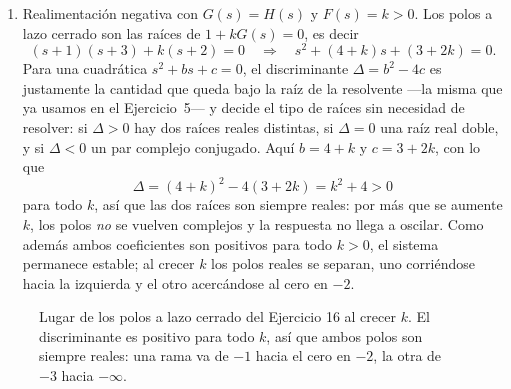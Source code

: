 \documentclass[10pt,a4paper]{article}
\begin{document}
\begin{enumerate}
	\item Realimentación negativa con $G(s)=H(s)$ y $F(s)=k>0$. Los polos a
	lazo cerrado son las raíces de $1+kG(s)=0$, es decir
	\[
		(s+1)(s+3)+k(s+2)=0
		\quad\Longrightarrow\quad
		s^2+(4+k)s+(3+2k)=0.
	\]
	Para una cuadrática $s^2+bs+c=0$, el discriminante $\Delta=b^2-4c$ es
	justamente la cantidad que queda bajo la raíz de la resolvente ---la
	misma que ya usamos en el Ejercicio~5--- y decide el tipo de raíces sin
	necesidad de resolver: si $\Delta>0$ hay dos raíces reales distintas, si
	$\Delta=0$ una raíz real doble, y si $\Delta<0$ un par complejo
	conjugado. Aquí $b=4+k$ y $c=3+2k$, con lo que
	\[
		\Delta=(4+k)^2-4(3+2k)=k^2+4>0
	\]
	para todo $k$, así que las dos raíces son siempre reales: por más que se
	aumente $k$, los polos \emph{no} se vuelven complejos y la respuesta no
	llega a oscilar. Como además ambos coeficientes son positivos para todo
	$k>0$, el sistema permanece estable; al crecer $k$ los polos reales se
	separan, uno corriéndose hacia la izquierda y el otro acercándose al cero
	en $-2$.
\end{enumerate}

\begin{figure}[h]
	\centering
	
	\caption{Lugar de los polos a lazo cerrado del Ejercicio 16 al crecer $k$.
	El discriminante es positivo para todo $k$, así que ambos polos son siempre
	reales: una rama va de $-1$ hacia el cero en $-2$, la otra de $-3$ hacia
	$-\infty$.}
	\label{fig:res_lugar_raices}
\end{figure}
\end{document}
